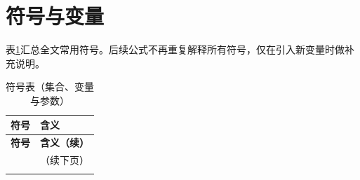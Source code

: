 \documentclass[UTF8,zihao=-4,a4paper,fontset=fandol]{ctexrep}
\begin{document}
\section{符号与变量}
表\ref{tab:symbols}汇总全文常用符号。后续公式不再重复解释所有符号，仅在引入新变量时做补充说明。

\begin{longtable}{p{}p{}}
\caption{符号表（集合、变量与参数）}\label{tab:symbols}\\
\toprule
\textbf{符号} & \textbf{含义}\\
\midrule
\endfirsthead
\toprule
\textbf{符号} & \textbf{含义（续）}\\
\midrule
\endhead
\midrule
\multicolumn{2}{r}{\small（续下页）}\\
\endfoot
\bottomrule
\endlastfoot


\end{longtable}
\end{document}
